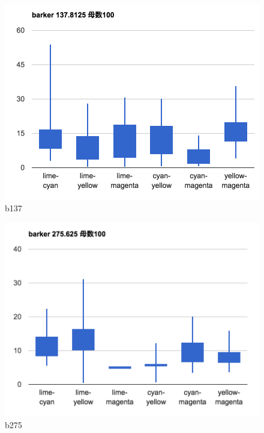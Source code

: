 \begin{figure}[p]
  \centering
  \includegraphics[clip,width=1.05\hsize]{img/b137.png}
  \caption{b137}\label{fig:b137}
\end{figure}

\begin{figure}[p]
  \centering
  \includegraphics[clip,width=1.05\hsize]{img/b275.png}
  \caption{b275}\label{fig:b275}
\end{figure}

